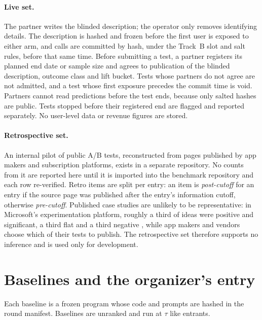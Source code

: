 \documentclass[11pt]{article}
\begin{document}
\paragraph{Live set.} The partner writes the blinded description; the operator only removes identifying details. The description is hashed and frozen before the first user is exposed to either arm, and calls are committed by hash, under the Track~B slot and salt rules, before that same time. Before submitting a test, a partner registers its planned end date or sample size and agrees to publication of the blinded description, outcome class and lift bucket. Tests whose partners do not agree are not admitted, and a test whose first exposure precedes the commit time is void. Partners cannot read predictions before the test ends, because only salted hashes are public. Tests stopped before their registered end are flagged and reported separately. No user-level data or revenue figures are stored.

\paragraph{Retrospective set.} An internal pilot of public A/B tests, reconstructed from pages published by app makers and subscription platforms, exists in a separate repository. No counts from it are reported here until it is imported into the benchmark repository and each row re-verified. Retro items are split per entry: an item is \emph{post-cutoff} for an entry if the source page was published after the entry's information cutoff, otherwise \emph{pre-cutoff}. Published case studies are unlikely to be representative: in Microsoft's experimentation platform, roughly a third of ideas were positive and significant, a third flat and a third negative \citep{kohavi2009tutorial,kohavi2020trustworthy}, while app makers and vendors choose which of their tests to publish. The retrospective set therefore supports no inference and is used only for development.

\section{Baselines and the organizer's entry}
\label{sec:baselines}

Each baseline is a frozen program whose code and prompts are hashed in the round manifest. Baselines are unranked and run at $\tau$ like entrants.
\end{document}
